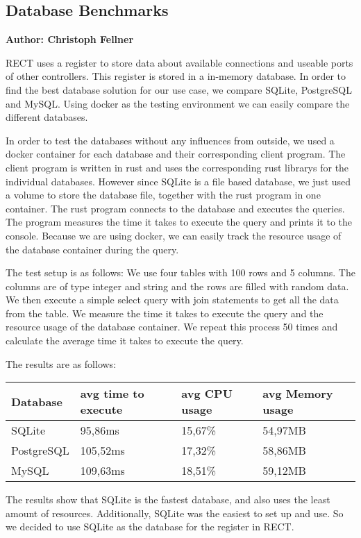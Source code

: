 \subsection{Database Benchmarks}
\textbf{Author: Christoph Fellner}

RECT uses a register to store data about available connections and useable ports of other controllers. This register is stored in a in-memory database. In order to find the 
best database solution for our use case, we compare SQLite, PostgreSQL and MySQL. Using docker as the testing environment we can easily compare the different databases.\newline

In order to test the databases without any influences from outside, we used a docker container for each database and their corresponding client program. The client program
is written in rust and uses the corresponding rust librarys for the individual databases. However since SQLite is a file based database, we just used a volume to store the
database file, together with the rust program in one container. The rust program connects to the database and executes the queries. The program measures the time it 
takes to execute the query and prints it to the console. Because we are using docker, we can easily track the resource usage of the database container during the query.\newline

The test setup is as follows: We use four tables with 100 rows and 5 columns. The columns are of type integer and string and the rows are filled with random data. We then 
execute a simple select query with join statements to get all the data from the table. We measure the time it takes to execute the query and the resource usage of the database 
container. We repeat this process 50 times and calculate the average time it takes to execute the query.\newline

The results are as follows:
\begin{center}
    \begin{tabular}{ | m{3cm} | m{4cm}| m{4cm} | m{4cm} | } 
      \hline
      Database & avg time to execute & avg CPU usage & avg Memory usage \\ 
      \hline
      SQLite & 95,86ms & 15,67\% & 54,97MB \\ 
      \hline
      PostgreSQL & 105,52ms & 17,32\% & 58,86MB \\ 
      \hline
      MySQL & 109,63ms & 18,51\% & 59,12MB \\
      \hline
    \end{tabular}
\end{center}

The results show that SQLite is the fastest database, and also uses the least amount of resources. Additionally, SQLite was the easiest to set up and use. So we decided to use
SQLite as the database for the register in RECT.

\filbreak